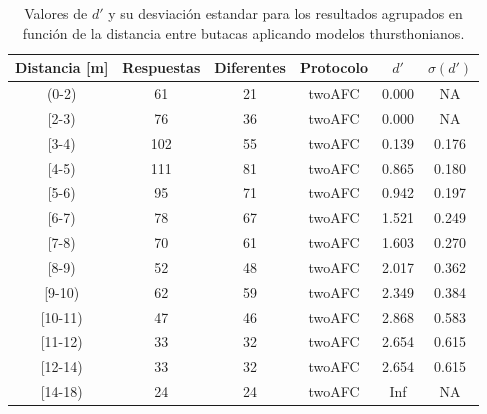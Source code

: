 \documentclass[11pt,a4paper,twoside]{book}
\begin{document}
            \begin{table}
			\begin{center}
			\begin{scriptsize}
			\begin{tabular}{| c | c | c | c || c | c |}
			    \hline
				\textbf{Distancia [m]}&\textbf{Respuestas}&\textbf{Diferentes}&\textbf{Protocolo}&\textbf{$d'$}&\textbf{$\sigma (d')$}\\ \hline
                (0-2)&61&21&twoAFC&0.000&NA\\ \hline
                [2-3)&76&36&twoAFC&0.000&NA\\ \hline
                [3-4)&102&55&twoAFC&0.139&0.176\\ \hline
                [4-5)&111&81&twoAFC&0.865&0.180\\ \hline
                [5-6)&95&71&twoAFC&0.942&0.197\\ \hline
                [6-7)&78&67&twoAFC&1.521&0.249\\ \hline
                [7-8)&70&61&twoAFC&1.603&0.270\\ \hline
                [8-9)&52&48&twoAFC&2.017&0.362\\ \hline
                [9-10)&62&59&twoAFC&2.349&0.384\\ \hline
                [10-11)&47&46&twoAFC&2.868&0.583\\ \hline
                [11-12)&33&32&twoAFC&2.654&0.615\\ \hline
                [12-14)&33&32&twoAFC&2.654&0.615\\ \hline
                [14-18)&24&24&twoAFC&Inf&NA\\ \hline
			\end{tabular}
			\caption{Valores de $d'$ y su desviación estandar para los resultados agrupados en función de la distancia entre butacas aplicando modelos thursthonianos.}
			\label{tablaThurstButacasDuda}
			\end{scriptsize}
			\end{center}	
		    \end{table}
		    
\end{document}
